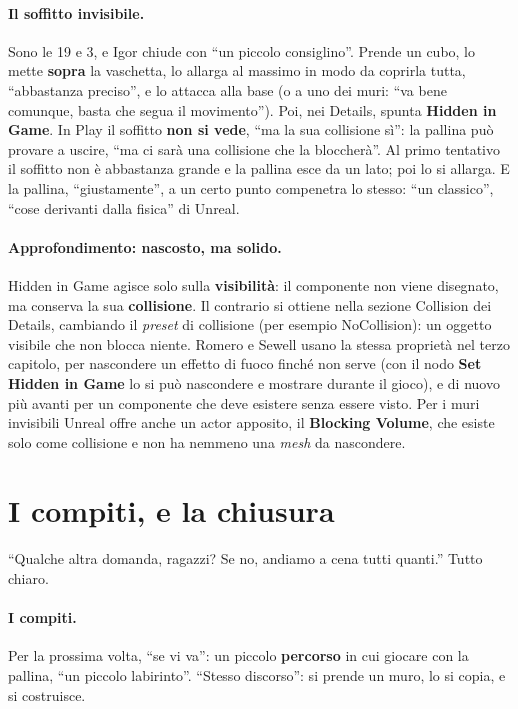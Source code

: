 \paragraph{Il soffitto invisibile.} Sono le 19 e 3, e Igor chiude con ``un piccolo
consiglino''. Prende un cubo, lo mette \textbf{sopra} la vaschetta, lo allarga al massimo
in modo da coprirla tutta, ``abbastanza preciso'', e lo attacca alla base (o a uno dei
muri: ``va bene comunque, basta che segua il movimento''). Poi, nei Details, spunta
\textbf{Hidden in Game}. In Play il soffitto \textbf{non si vede}, ``ma la sua collisione
sì'': la pallina può provare a uscire, ``ma ci sarà una collisione che la bloccherà''. Al
primo tentativo il soffitto non è abbastanza grande e la pallina esce da un lato; poi lo
si allarga. E la pallina, ``giustamente'', a un certo punto compenetra lo stesso: ``un
classico'', ``cose derivanti dalla fisica'' di Unreal.

\paragraph{Approfondimento: nascosto, ma solido.} Hidden in Game agisce solo sulla
\textbf{visibilità}: il componente non viene disegnato, ma conserva la sua
\textbf{collisione}. Il contrario si ottiene nella sezione Collision dei Details,
cambiando il \emph{preset} di collisione (per esempio NoCollision): un oggetto visibile
che non blocca niente. Romero e Sewell usano la stessa proprietà nel terzo capitolo, per
nascondere un effetto di fuoco finché non serve (con il nodo \textbf{Set Hidden in Game}
lo si può nascondere e mostrare durante il gioco), e di nuovo più avanti per un
componente che deve esistere senza essere visto. Per i muri invisibili Unreal offre
anche un actor apposito, il \textbf{Blocking Volume}, che esiste solo come collisione e
non ha nemmeno una \emph{mesh} da nascondere.

\section{I compiti, e la chiusura}
\label{ue2:sec:chiusura}

``Qualche altra domanda, ragazzi? Se no, andiamo a cena tutti quanti.'' Tutto chiaro.

\paragraph{I compiti.} Per la prossima volta, ``se vi va'': un piccolo
\textbf{percorso} in cui giocare con la pallina, ``un piccolo labirinto''. ``Stesso
discorso'': si prende un muro, lo si copia, e si costruisce.

